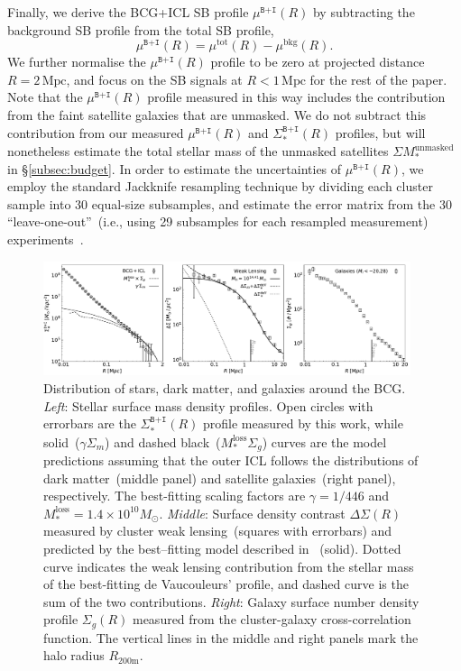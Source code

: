\documentclass[fleqn,usenatbib]{mnras}
\def\mrm{\mathrm}
\newcommand{\sigbi}{\Sigma_*^{\texttt{B+I}}}
\newcommand{\sigm}{\Sigma_m}
\newcommand{\sigg}{\Sigma_g}
\newcommand{\mubi}{\mu^{\texttt{B+I}}}
\newcommand{\mpc}{\mathrm{Mpc}}
\newcommand{\msol}{M_{\odot}}
\newcommand{\ds}{\Delta\Sigma}
\begin{document}
Finally, we derive the BCG+ICL SB profile $\mubi(R)$ by subtracting the
background SB profile from the total SB profile,
\begin{equation}
\mubi(R) = \mu^{\mathrm{tot}}(R) - \mu^{\mathrm{bkg}}(R).
\end{equation}
We further normalise the $\mubi(R)$ profile to be zero at projected
distance $R{=}2\,\mpc$, and focus on the SB signals at $R{<}1\,\mpc$ for
the rest of the paper. Note that the $\mubi(R)$ profile measured in this
way includes the contribution from the faint satellite galaxies that are
unmasked. We do not subtract this contribution from our measured $\mubi(R)$
and $\sigbi(R)$ profiles, but will nonetheless estimate the total stellar
mass of the unmasked satellites $\Sigma M_*^{\mathrm{unmasked}}$ in
\S\ref{subsec:budget}. In order to estimate the uncertainties of
$\mubi(R)$, we employ the standard Jackknife resampling technique by
dividing each cluster sample into 30 equal-size subsamples, and estimate
the error matrix from the 30 ``leave-one-out''~(i.e., using 29 subsamples
for each resampled measurement) experiments~\citep{Efron1981}.

\begin{figure}
    \centering\includegraphics[width=0.96\textwidth]{fig/total_sample_SB_SM.pdf}
    \caption{Distribution of stars, dark matter, and galaxies around the
    BCG.  {\it Left}: Stellar surface mass density profiles. Open circles
    with errorbars are the $\sigbi(R)$ profile measured by this work, while
    solid~($\gamma\sigm$) and dashed black~($M_*^{\mathrm{loss}}\sigg$)
    curves are the model predictions assuming that the outer ICL follows
    the distributions of dark matter~(middle panel) and satellite
    galaxies~(right panel), respectively. The best-fitting scaling factors
    are $\gamma{=}1/446$ and
    $M_*^{\mathrm{loss}}{=}1.4{\times}10^{10}\msol$.  {\it Middle}: Surface
    density contrast $\ds(R)$ measured by cluster weak lensing~(squares
    with errorbars) and predicted by the best--fitting model described in
    ~(solid). Dotted curve indicates the weak lensing
    contribution from the stellar mass of the best-fitting de Vaucouleurs'
    profile, and dashed curve is the sum of the two contributions.  {\it
    Right}: Galaxy surface number density profile $\sigg(R)$ measured from
    the cluster-galaxy cross-correlation function. The vertical lines in
    the middle and right panels mark the halo radius $R_{200\mrm{m}}$.
    \label{fig:massprof3panel} }
\end{figure}
\end{document}
